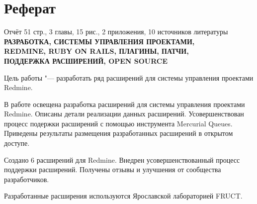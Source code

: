 \newpage

\thispagestyle{empty}

\section*{Реферат}

\noindent
Отчёт 51 стр., 3 главы, 15 рис., 2 приложения, 10 источников литературы \\
\textbf{
РАЗРАБОТКА, СИСТЕМЫ УПРАВЛЕНИЯ ПРОЕКТАМИ, \\ REDMINE, RUBY ON RAILS,
ПЛАГИНЫ, ПАТЧИ, \\ ПОДДЕРЖКА РАСШИРЕНИЙ, OPEN SOURCE
}

Цель работы "--- разработать ряд расширений для системы управления проектами
Redmine.

В работе освещена разработка расширений для системы управления проектами
Redmine. Описаны детали реализации данных расширений. Усовершенствован процесс
подержки расширений с помощью инструмента Mercurial Queues. Приведены
результаты размещения разработанных расширений в открытом доступе.

Создано 6 расширений для Redmine. Внедрен усовершенствованный процесс поддержки
расширений. Получены отзывы и улучшения от сообщества разработчиков.

Разработанные расширения используются Ярославской лабораторией FRUCT.


